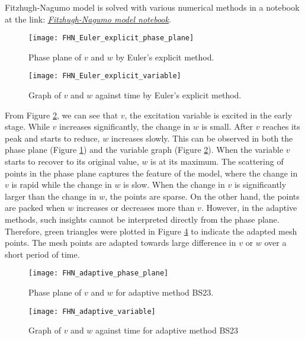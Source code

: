 Fitzhugh-Nagumo model is solved with various numerical methods in a notebook at the link:  \href{https://nbviewer.jupyter.org/github/FarmHJ/numerical-solver/blob/main/examples/fitzhugh_nagumo.ipynb}{\underline{\emph{Fitzhugh-Nagumo model notebook}}}. 

\begin{figure}
    \texttt{[image: FHN\_Euler\_explicit\_phase\_plane]}
    \caption{Phase plane of $v$ and $w$ by Euler's explicit method.}
    \label{fig:Euler_explicit_phase_plane}
\end{figure}

\begin{figure}
    \texttt{[image: FHN\_Euler\_explicit\_variable]}
    \caption{Graph of $v$ and $w$ against time by Euler's explicit method.}
    \label{fig:Euler_explicit_variable}
\end{figure}


From Figure \ref{fig:Euler_explicit_variable}, we can see that $v$, the excitation variable is excited in the early stage. While $v$ increases significantly, the change in $w$ is small. After $v$ reaches its peak and starts to reduce, $w$ increases slowly. This can be observed in both the phase plane (Figure \ref{fig:Euler_explicit_phase_plane}) and the variable graph (Figure \ref{fig:Euler_explicit_variable}). When the variable $v$ starts to recover to its original value, $w$ is at its maximum. The scattering of points in the phase plane captures the feature of the model, where the change in $v$ is rapid while the change in $w$ is slow. When the change in $v$ is significantly larger than the change in $w$, the points are sparse. On the other hand, the points are packed when $w$ increases or decreases more than $v$. However, in the adaptive methods, such insights cannot be interpreted directly from the phase plane. Therefore, green triangles were plotted in Figure \ref{fig:adaptive_variable} to indicate the adapted mesh points. The mesh points are adapted towards large difference in $v$ or $w$ over a short period of time.

\begin{figure}
    \texttt{[image: FHN\_adaptive\_phase\_plane]}
    \caption{Phase plane of $v$ and $w$ for adaptive method BS23.}
    \label{fig:adaptive_phase_plane}
\end{figure}

\begin{figure}
    \texttt{[image: FHN\_adaptive\_variable]}
    \caption{Graph of $v$ and $w$ against time for adaptive method BS23}
    \label{fig:adaptive_variable}
\end{figure}

